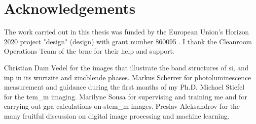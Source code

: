 \chapter{Acknowledgements}

The work carried out in this thesis was funded by the European Union's Horizon 2020 project "\acl{design}" (\acs{design}) with grant number 860095 \cite{CordisDESIGN}. I thank the Cleanroom Operations Team of the \acl{brnc} for their help and support. 

Christian Dam Vedel for the images that illustrate the band structures of \acs{si}, and \acs{inp} in its wurtzite and zincblende phases.
Markus Scherrer for photoluminescence measurement and guidance during the first months of my Ph.D. 
Michael Stiefel for the \acs{tem_m} imaging. 
Marilyne Sousa for supervising and training me and for carrying out \acs{gpa} calculations on \acs{stem_m} images. 
Preslav Aleksandrov for the many fruitful discussion on digital image processing and machine learning.